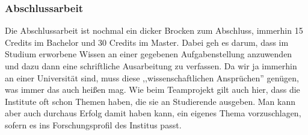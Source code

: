 \begin{multicols}{2}
	\subsubsection{Abschlussarbeit}
Die Abschlussarbeit ist nochmal ein dicker Brocken zum Abschluss, immerhin 15 Credits im Bachelor und 30 Credits im Master. Dabei geh es darum, dass im Studium erworbene Wissen an einer gegebenen Aufgabenstellung anzuwenden und dazu dann eine schriftliche Ausarbeitung zu verfassen. Da wir ja immerhin an einer Universität sind, muss diese ,,wissenschaftlichen Ansprüchen'' genügen, was immer das auch heißen mag. Wie beim Teamprojekt gilt auch hier, dass die Institute oft schon Themen haben, die sie an Studierende ausgeben.  Man kann aber auch durchaus Erfolg damit haben kann, ein eigenes Thema  vorzuschlagen, sofern es ins Forschungsprofil des Institus passt. 

\end{multicols}